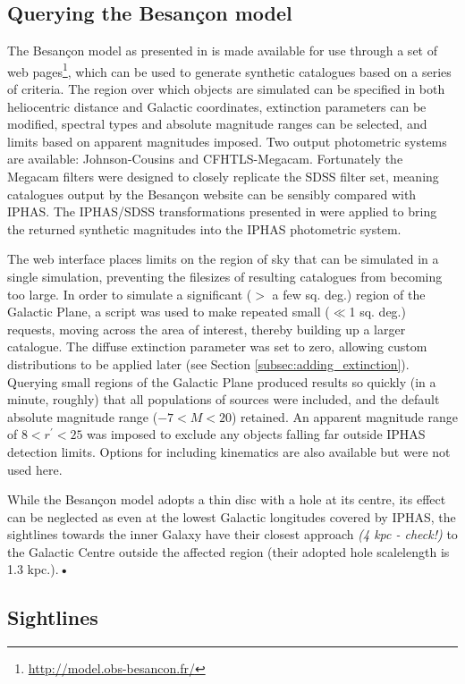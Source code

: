 \documentclass[a4paper,useAMS,usenatbib]{mn2e}
\begin{document}
\subsection{Querying the Besan\c{c}on model}
The Besan\c{c}on model as presented in \citet{Robin2003} is made available for
use through a set of web pages\footnote{\url{http://model.obs-besancon.fr/}},
which can be used to generate synthetic catalogues based on a series of
criteria. The region over which objects are simulated can be specified in both
heliocentric distance and Galactic coordinates, extinction parameters can be
modified, spectral types and absolute magnitude ranges can be selected, and
limits based on apparent magnitudes imposed. Two output photometric systems
are available: Johnson-Cousins and CFHTLS-Megacam. Fortunately the Megacam
filters were designed to closely replicate the SDSS filter set, meaning
catalogues output by the Besan\c{c}on website can be sensibly compared with
IPHAS. The IPHAS/SDSS transformations presented in \citet{Barentsen2014} were
applied to bring the returned synthetic magnitudes into the IPHAS photometric
system.

The web interface places limits on the region of sky that can be simulated in
a single simulation, preventing the filesizes of resulting catalogues from
becoming too large. In order to simulate a significant ($>$ a few sq. deg.)
region of the Galactic Plane, a script was used to make repeated small ($\ll$1
sq. deg.) requests, moving across the area of interest, thereby building up a
larger catalogue. The diffuse extinction parameter was set to zero, allowing
custom distributions to be applied later (see Section
\ref{subsec:adding_extinction}). Querying small regions of the Galactic Plane
produced results so quickly (in a minute, roughly) that all populations of
sources were included, and the default absolute magnitude range ($-7 < M <
20$) retained. An apparent magnitude range of $8<r^{\prime}<25$ was imposed to
exclude any objects falling far outside IPHAS detection limits. Options for
including kinematics are also available but were not used here.

While the Besan\c{c}on model adopts a thin disc with a hole at its centre, its effect can be neglected as even at the lowest Galactic longitudes covered by IPHAS, the sightlines towards the inner Galaxy have their closest approach \textit{(4 kpc - check!)} to the Galactic Centre outside the affected region (their adopted hole scalelength is 1.3 kpc.).\textbf{•}

\subsection{Sightlines}
\end{document}
